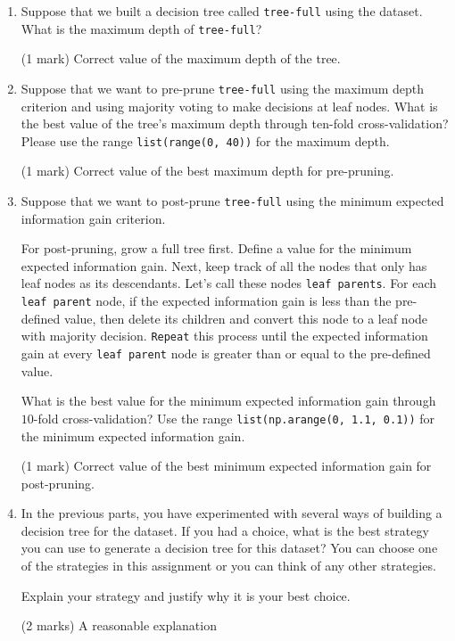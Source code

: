 \documentclass[12pt]{article}
\begin{document}
\begin{enumerate}[font=\Large,label=(\alph*)]
\begin{markscheme}
\end{markscheme}

\item 
Suppose that we built a decision tree called \verb+tree-full+ using the dataset. What is the maximum depth of \verb+tree-full+? 

\begin{markscheme}

(1 mark) Correct value of the maximum depth of the tree.
\end{markscheme}

\item 
Suppose that we want to pre-prune \verb+tree-full+ using the maximum depth criterion and using majority voting to make decisions at leaf nodes. What is the best value of the tree's maximum depth through ten-fold cross-validation? Please use the range \verb+list(range(0, 40))+ for the maximum depth.

\begin{markscheme}

(1 mark) Correct value of the best maximum depth for pre-pruning.
\end{markscheme}

\item 
Suppose that we want to post-prune \verb+tree-full+ using the minimum expected information gain criterion.

For post-pruning, grow a full tree first. Define a value for the minimum expected information gain. Next, keep track of all the nodes that only has leaf nodes as its descendants. Let's call these nodes \verb+leaf parents+. For each \verb+leaf parent+ node, if the expected information gain is less than the pre-defined value, then delete its children and convert this node to a leaf node with majority decision. \verb+Repeat+ this process until the expected information gain at every \verb+leaf parent+ node is greater than or equal to the pre-defined value.

What is the best value for the minimum expected information gain through $10$-fold cross-validation? Use the range \verb+list(np.arange(0, 1.1, 0.1))+ for the minimum expected information gain.

\begin{markscheme}

(1 mark) Correct value of the best minimum expected information gain for post-pruning.
\end{markscheme}

\item 
In the previous parts, you have experimented with several ways of building a decision tree for the dataset. If you had a choice, what is the best strategy you can use to generate a decision tree for this dataset? You can choose one of the strategies in this assignment or you can think of any other strategies. 

Explain your strategy and justify why it is your best choice.
\begin{markscheme}

(2 marks) A reasonable explanation
\end{markscheme}

\end{enumerate}
\end{document}
